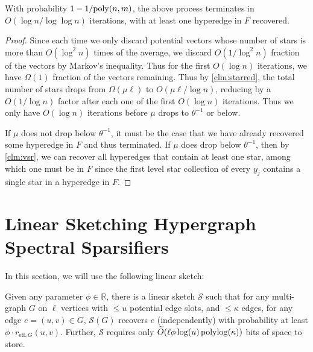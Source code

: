 \documentclass{article}
\begin{document}
\begin{claim}
    With probability $1 - 1/\mathrm{poly}(n,m)$,
    the above process terminates in $O(\log n / \log\log n)$ iterations,
    with at least one hyperedge in $F$ recovered.
\end{claim}
\begin{proof}
    Since each time we only discard potential vectors whose number of stars
    is more than $O(\log^2 n)$ times of the average,
    we discard $O(1/\log^2 n)$ fraction of the vectors by Markov's inequality.
    Thus for the first $O(\log n)$ iterations,
    we have $\Omega(1)$ fraction of the vectors remaining.
    Thus by \cref{clm:starred}, the total number of stars drops from $\Omega(\mu\ell)$
    to $O(\mu\ell/\log n)$,
    reducing by a $O(1/\log n)$ factor after each one of the
    first $O(\log n)$ iterations.
    Thus we only have $O(\log n)$ iterations before
    $\mu$ drops to $\theta^{-1}$ or below.

    If $\mu$ does not drop below $\theta^{-1}$,
    it must be the case that we have already recovered some hyperedge in $F$
    and thus terminated.
    If $\mu$ does drop below $\theta^{-1}$,
    then by \cref{clm:vsr}, we can recover all hyperedges
    that contain at least one star,
    among which one must be in $F$ since the first level star collection
    of every $y_j$ contains a single star in a hyperedge in $F$.
\end{proof}




\section{Linear Sketching Hypergraph Spectral Sparsifiers}\label{sec:linearSketching}

In this section, we will use the following linear sketch:

\begin{theorem}\cite{KLMMS14}\label{thm:multigraphERSampling}
    Given any parameter $\phi\in \mathbb{R}$, there is a linear sketch $\mathcal{S}$ such that for any multi-graph $G$ on $\ell$ vertices with $\leq u$ potential edge slots, and $\leq \kappa$ edges, for any edge $e = (u,v) \in G$, $\mathcal{S}(G)$ recovers $e$ (independently) with probability at least $\phi \cdot r_{\text{eff}, G}(u,v)$. Further, $\mathcal{S}$ requires only $\widetilde{O}(\ell \phi \log(u) \operatorname{polylog}(\kappa) )$ bits of space to store. 
\end{theorem}
\end{document}
